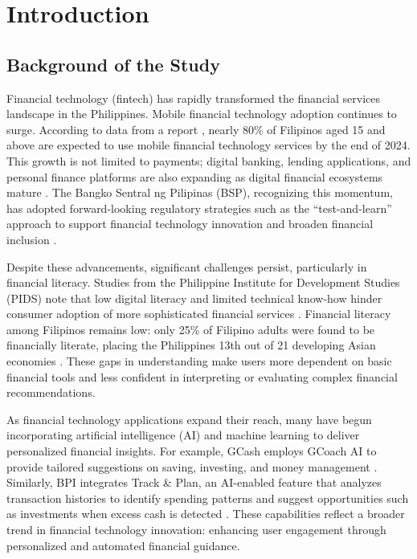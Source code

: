 \documentclass[journal]{./IEEE/IEEEtran}
\begin{document}
\section{Introduction}

\subsection{Background of the Study}

Financial technology (fintech) has rapidly transformed the financial services landscape in the Philippines. Mobile financial technology adoption continues to surge. According to data from a report \cite{ref1}, nearly 80\% of Filipinos aged 15 and above are expected to use mobile financial technology services by the end of 2024. This growth is not limited to payments; digital banking, lending applications, and personal finance platforms are also expanding as digital financial ecosystems mature \cite{ref2}. The Bangko Sentral ng Pilipinas (BSP), recognizing this momentum, has adopted forward-looking regulatory strategies such as the ``test-and-learn'' approach to support financial technology innovation and broaden financial inclusion \cite{ref3}.

Despite these advancements, significant challenges persist, particularly in financial literacy. Studies from the Philippine Institute for Development Studies (PIDS) note that low digital literacy and limited technical know-how hinder consumer adoption of more sophisticated financial services \cite{ref4}. Financial literacy among Filipinos remains low: only 25\% of Filipino adults were found to be financially literate, placing the Philippines 13th out of 21 developing Asian economies \cite{ref5}. These gaps in understanding make users more dependent on basic financial tools and less confident in interpreting or evaluating complex financial recommendations.

As financial technology applications expand their reach, many have begun incorporating artificial intelligence (AI) and machine learning to deliver personalized financial insights. For example, GCash employs GCoach AI to provide tailored suggestions on saving, investing, and money management \cite{ref6}. Similarly, BPI integrates Track \& Plan, an AI-enabled feature that analyzes transaction histories to identify spending patterns and suggest opportunities such as investments when excess cash is detected \cite{ref7}. These capabilities reflect a broader trend in financial technology innovation: enhancing user engagement through personalized and automated financial guidance.
\end{document}
